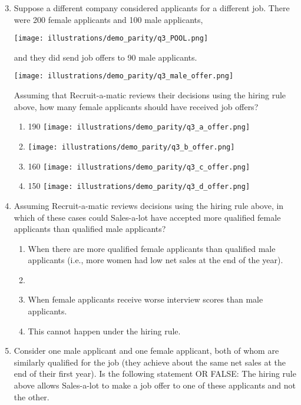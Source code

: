 \documentclass{article}
\newcommand{\correct}[1]{{\color{red}{#1}}}
\newcommand{\correct}[1]{{\color{red}{#1}}}
\begin{document}
\begin{enumerate}
\setcounter{enumi}{2}
    \item Suppose a different company considered applicants for a different job. There were 200 female applicants and 100 male applicants,

\texttt{[image: illustrations/demo\_parity/q3\_POOL.png]}

and they did send job offers to 90 male applicants.

\texttt{[image: illustrations/demo\_parity/q3\_male\_offer.png]}

Assuming that Recruit-a-matic reviews their decisions using the hiring rule above, how many female applicants should have received job offers?
\begin{enumerate}
    \item 190
    \texttt{[image: illustrations/demo\_parity/q3\_a\_offer.png]}
    \item \correct{180}
    \texttt{[image: illustrations/demo\_parity/q3\_b\_offer.png]}
    \item 160
    \texttt{[image: illustrations/demo\_parity/q3\_c\_offer.png]}
    \item 150
    \texttt{[image: illustrations/demo\_parity/q3\_d\_offer.png]}
\end{enumerate}

\item Assuming Recruit-a-matic reviews decisions using the hiring rule above, in which of these cases could Sales-a-lot have accepted more qualified female applicants than qualified male applicants?

\begin{enumerate}
    \item When there are more qualified female applicants than qualified male applicants (i.e., more women had low net sales at the end of the year).
    \item \correct{When there are more female applicants than male applicants.}
    \item When female applicants receive worse interview scores than male applicants.
    \item This cannot happen under the hiring rule.
\end{enumerate}

\item Consider one male applicant and one female applicant, both of whom are similarly qualified for the job (they achieve about the same net sales at the end of their first year). Is the following statement \correct{TRUE} OR FALSE: The hiring rule above allows Sales-a-lot to make a job offer to one of these applicants and not the other.


\end{enumerate}
\end{document}
